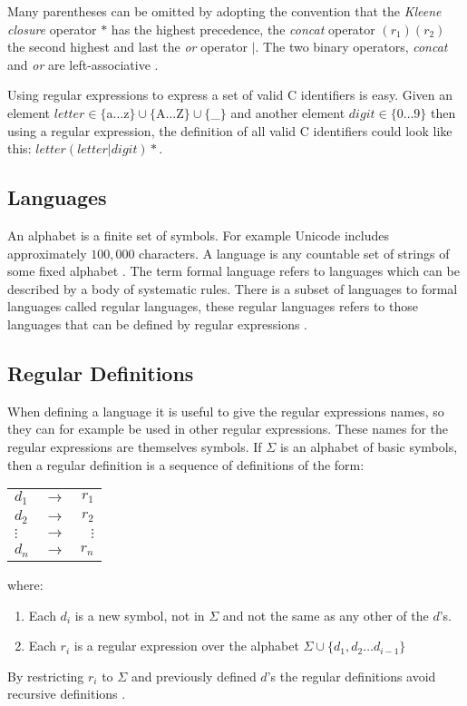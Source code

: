 Many parentheses can be omitted by adopting the convention that the \emph{Kleene
closure} operator $*$ has the highest precedence, the \emph{concat} operator
$(r_1)(r_2)$ the second highest and last the \emph{or} operator $|$. The two
binary operators, \emph{concat} and \emph{or} are left-associative \cite{Aho1990}.

\begin{example}\label{regexpEx}
Using regular expressions to express a set of valid C identifiers is easy.
Given an element $letter \in \{$a$ \dots $z$\} \cup \{$A$ \dots $Z$\} \cup 
\{$\_$\}$ and another element $digit \in \{0 \dots 9\}$ then using a regular
expression, the definition of all valid C identifiers 
could look like this: $letter (letter | digit)*$. 
\end{example}

\subsection{Languages}
An alphabet is a finite set of symbols. For example Unicode includes
approximately $100,000$ characters. A language is any countable set of strings
of some fixed alphabet \cite{Aho2006}. The term formal language refers to
languages which can be described by a body of systematic rules. There is a
subset of languages to formal languages called regular languages, these regular
languages refers to those languages that can be defined by regular expressions
\cite{Ranta2012}.

\subsection{Regular Definitions}
When defining a language it is useful to give the regular expressions names,
so they can for example be used in other regular expressions. These names for
the regular expressions are themselves symbols. If $\Sigma$ is an alphabet of
basic symbols, then a regular definition is a sequence of definitions of the
form:
\begin{center}
\begin{tabular}{l c r}
$d_1$ & $\to$ & $r_1$\\
$d_2$ & $\to$ & $r_2$\\
$\vdots$ & $\to$ & $\vdots$\\
$d_n$ & $\to$ & $r_n$\\

\end{tabular}
\end{center}
where:
\begin{enumerate}
\item Each $d_i$ is a new symbol, not in $\Sigma$ and not the same as any other
of the $d$'s.
\item Each $r_i$ is a regular expression over the alphabet $\Sigma  \cup \{d_1,
d_2 \dots d_{i-1}\}$
\end{enumerate}
By restricting $r_i$ to $\Sigma$ and previously defined $d$'s the regular
definitions avoid recursive definitions \cite{Aho2006}.

